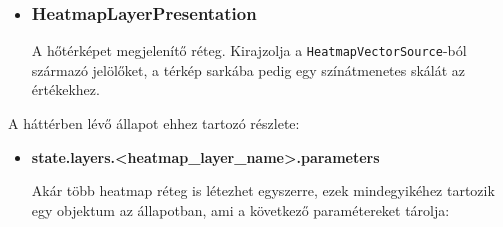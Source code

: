 \begin{itemize}
\item\subsubsection{HeatmapLayerPresentation}
A hőtérképet megjelenítő réteg. Kirajzolja a \verb|HeatmapVectorSource|-ból
származó jelölőket, a térkép sarkába pedig egy színátmenetes skálát az
értékekhez.

\end{itemize}
\noindent A háttérben lévő állapot ehhez tartozó részlete:
\begin{itemize}

  \item \textbf{state.layers.<heatmap\_layer\_name>.parameters}

  Akár több heatmap réteg is létezhet egyszerre, ezek mindegyikéhez tartozik egy
  objektum az állapotban, ami a következő paramétereket tárolja:


\end{itemize}
